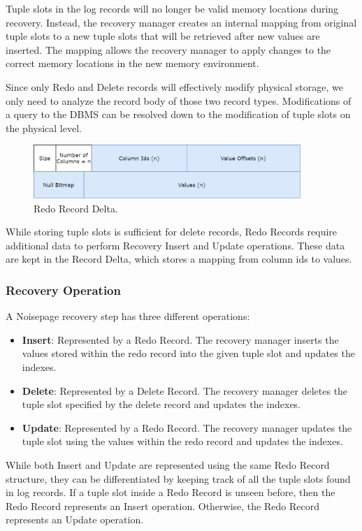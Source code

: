 \documentclass[12pt]{cmuthesis}
\begin{document}
Tuple slots in the log records will no longer be valid memory locations during recovery. Instead, the recovery manager creates an internal mapping from original tuple slots to a new tuple slots that will be retrieved after new values are inserted. The mapping allows the recovery manager to apply changes to the correct memory locations in the new memory environment.

Since only Redo and Delete records will effectively modify physical storage, we only need to analyze the record body of those two record types. Modifications of a query to the DBMS can be resolved down to the modification of tuple slots on the physical level.

\begin{figure}[H]
\centering
\includegraphics[width=0.9\textwidth]{images/Delta.png}
\caption{Redo Record Delta.}
\label{fig:logging}
\end{figure}

 While storing tuple slots is sufficient for delete records, Redo Records require additional data to perform Recovery Insert and Update operations. These data are kept in the Record Delta, which stores a mapping from column ids to values.

\subsubsection{Recovery Operation}
A Noisepage recovery step has three different operations:
\begin{itemize}
    \item \textbf{Insert}: Represented by a Redo Record. The recovery manager inserts the values stored within the redo record into the given tuple slot and updates the indexes.
    \item \textbf{Delete}: Represented by a Delete Record. The recovery manager deletes the tuple slot specified by the delete record and updates the indexes.
    \item \textbf{Update}: Represented by a Redo Record. The recovery manager updates the tuple slot using the values within the redo record and updates the indexes.
\end{itemize}

While both Insert and Update are represented using the same Redo Record structure, they can be differentiated by keeping track of all the tuple slots found in log records. If a tuple slot inside a Redo Record is unseen before, then the Redo Record represents an Insert operation. Otherwise, the Redo Record represents an Update operation.
\end{document}
